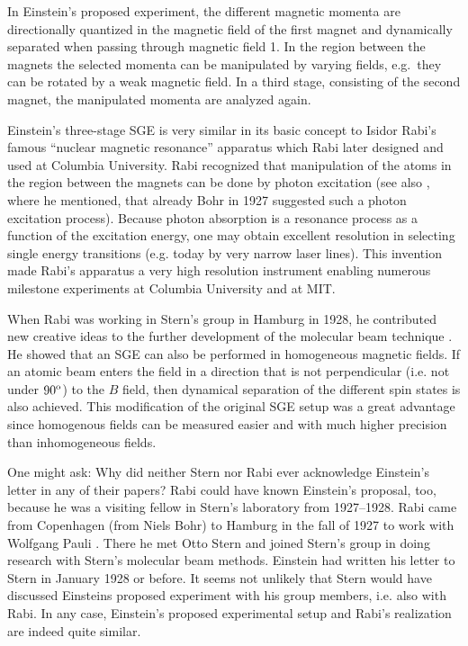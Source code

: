 \documentclass[12pt]{article}
\begin{document}
In Einstein's proposed experiment, the different magnetic momenta are directionally quantized in the magnetic field of the first magnet and dynamically separated when passing through magnetic field 1. In the region between the magnets the selected momenta can be manipulated by varying fields, e.g.\ they can be rotated by a weak magnetic field. In a third stage, consisting of the second magnet, the manipulated momenta are analyzed again. 

Einstein's three-stage SGE is very similar in its basic concept to Isidor Rabi's famous ``nuclear magnetic resonance'' apparatus \citep{RabiIEtal1934Moment,RabiIEtal1939Method,KelloggMEtal1939Moments} which Rabi later designed and used at Columbia University. Rabi recognized that manipulation of the atoms in the region between the magnets can be done by photon excitation (see also \cite[pp.~191--192]{HeisenbergW1927Inhalt}, where he mentioned, that already Bohr in 1927 suggested such a photon excitation process). Because photon absorption is a resonance process as a function of the excitation energy, one may obtain excellent resolution in selecting single energy transitions (e.g. today by very narrow laser lines). This invention made Rabi's apparatus a very high resolution instrument enabling numerous milestone experiments at Columbia University and at MIT. 

When Rabi was working in Stern's group in Hamburg in 1928, he contributed new creative ideas to the further development of the molecular beam technique \citep{RabiI1929Methode}. He showed that an SGE can also be performed in homogeneous magnetic fields. If an atomic beam enters the field in a direction that is not perpendicular (i.e. not under $90^{\rm o}$) to the $B$ field, then dynamical separation of the different spin states is also achieved. This modification of the original SGE setup was a great advantage since homogenous fields can be measured easier and with much higher precision than inhomogeneous fields. 

One might ask: Why did neither Stern nor Rabi ever acknowledge Einstein's letter in any of their papers? Rabi could have known Einstein's proposal, too, because he was a visiting fellow in Stern's laboratory from 1927--1928. Rabi came from Copenhagen (from Niels Bohr) to Hamburg in the fall of 1927 to work with Wolfgang Pauli \citep{SchmidtBoeckingHEtal2011Stern,ToenniesJEtal2011Stern}. There he met Otto Stern and joined Stern's group in doing research with Stern's molecular beam methods. Einstein had written his letter to Stern in January 1928 or before. It seems not unlikely that Stern would have discussed Einsteins proposed experiment with his group members, i.e. also with Rabi. In any case,
Einstein's proposed experimental setup and Rabi's realization are indeed quite similar. 
\end{document}

